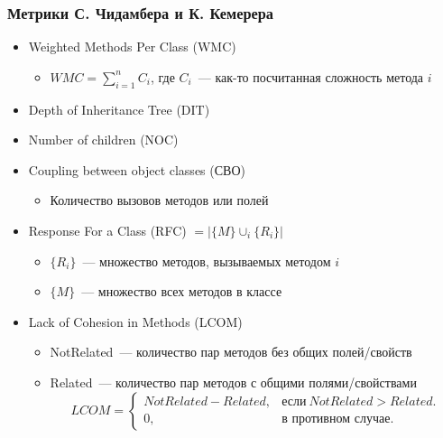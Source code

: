 \documentclass{../../slides-style}
\begin{document}
    \begin{frame}
        \frametitle{Метрики С. Чидамбера и К. Кемерера}
        \begin{itemize}
            \item Weighted Methods Per Class (WMC)
            \begin{itemize}
                \item $WMC = \sum_{i=1}^{n}C_i$, где $C_i$~--- как-то посчитанная сложность метода $i$
            \end{itemize}
            \item Depth of Inheritance Tree (DIT)
            \item Number of children (NOC)
            \item Coupling between object classes (СВО)
            \begin{itemize}
                \item Количество вызовов методов или полей
            \end{itemize}
            \item Response For a Class (RFC) $= |\{M\} \cup_{i} \{R_i\}| $
            \begin{itemize}
                \item $\{R_i\}$~--- множество методов, вызываемых методом $i$
                \item $\{M\}$~--- множество всех методов в классе
            \end{itemize}
            \item Lack of Cohesion in Methods (LCOM)
            \begin{itemize}
                \item NotRelated~--- количество пар методов без общих полей/свойств
                \item Related~--- количество пар методов с общими полями/свойствами
                    \begin{equation*}
                        LCOM=\begin{cases}
                            NotRelated - Related, & \text{если}\ NotRelated > Related.\\
                            0,                    & \text{в противном случае}.
                        \end{cases}
                    \end{equation*}
            \end{itemize}
        \end{itemize}
    \end{frame}
\end{document}
